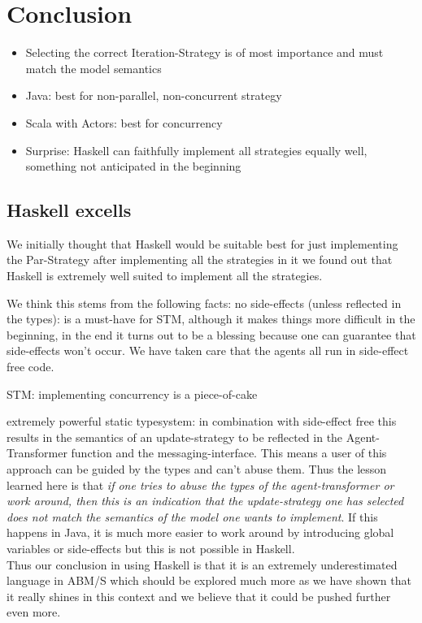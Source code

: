 \section{Conclusion}
\begin{itemize}
	\item Selecting the correct Iteration-Strategy is of most importance and must match the model semantics
	\item Java: best for non-parallel, non-concurrent strategy
	\item Scala with Actors: best for concurrency
	\item Surprise: Haskell can faithfully implement all strategies equally well, something not anticipated in the beginning
\end{itemize} 

\subsection{Haskell excells}
We initially thought that Haskell would be suitable best for just implementing the Par-Strategy after implementing all the strategies in it we found out that Haskell is extremely well suited to implement all the strategies. 

We think this stems from the following facts: 
no side-effects (unless reflected in the types): is a must-have for STM, although it makes things more difficult in the beginning, in the end it turns out to be a blessing because one can guarantee that side-effects won't occur. We have taken care that the agents all run in side-effect free code.
 
STM: implementing concurrency is a piece-of-cake

extremely powerful static typesystem: in combination with side-effect free this results in the semantics of an update-strategy to be reflected in the Agent-Transformer function and the messaging-interface. This means a user of this approach can be guided by the types and can't abuse them. Thus the lesson learned here is that \textit{if one tries to abuse the types of the agent-transformer or work around, then this is an indication that the update-strategy one has selected does not match the semantics of the model one wants to implement}. If this happens in Java, it is much more easier to work around by introducing global variables or side-effects but this is not possible in Haskell. \\
Thus our conclusion in using Haskell is that it is an extremely underestimated language in ABM/S which should be explored much more as we have shown that it really shines in this context and we believe that it could be pushed further even more.